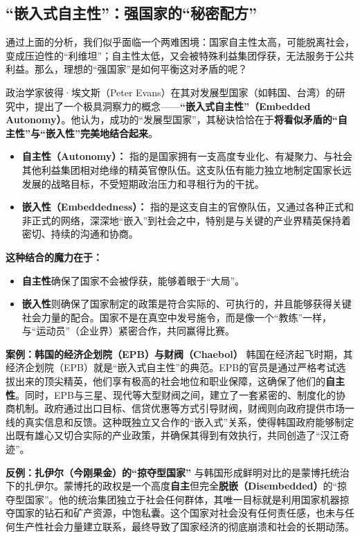 \hrulefill

\subsection{“嵌入式自主性”：强国家的“秘密配方”}

通过上面的分析，我们似乎面临一个两难困境：国家自主性太高，可能脱离社会，变成压迫性的“利维坦”；自主性太低，又会被特殊利益集团俘获，无法服务于公共利益。那么，理想的“强国家”是如何平衡这对矛盾的呢？

政治学家彼得·埃文斯（Peter Evans）在其对发展型国家（如韩国、台湾）的研究中，提出了一个极具洞察力的概念——\textbf{“嵌入式自主性”（Embedded Autonomy）}。他认为，成功的“发展型国家”，其秘诀恰恰在于\textbf{将看似矛盾的“自主性”与“嵌入性”完美地结合起来}。

\begin{itemize}
    \item \textbf{自主性（Autonomy）：} 指的是国家拥有一支高度专业化、有凝聚力、与社会其他利益集团相对绝缘的精英官僚队伍。这支队伍有能力独立地制定国家长远发展的战略目标，不受短期政治压力和寻租行为的干扰。
    \item \textbf{嵌入性（Embeddedness）：} 指的是这支自主的官僚队伍，又通过各种正式和非正式的网络，深深地“嵌入”到社会之中，特别是与关键的产业界精英保持着密切、持续的沟通和协商。
\end{itemize}

\textbf{这种结合的魔力在于：}
\begin{itemize}
    \item \textbf{自主性}确保了国家不会被俘获，能够着眼于“大局”。
    \item \textbf{嵌入性}则确保了国家制定的政策是符合实际的、可执行的，并且能够获得关键社会力量的配合。国家不是在真空中发号施令，而是像一个“教练”一样，与“运动员”（企业界）紧密合作，共同赢得比赛。
\end{itemize}

\textbf{案例：韩国的经济企划院（EPB）与财阀（Chaebol）}
韩国在经济起飞时期，其经济企划院（EPB）就是“嵌入式自主性”的典范。EPB的官员是通过严格考试选拔出来的顶尖精英，他们享有极高的社会地位和职业保障，这确保了他们的\textbf{自主性}。同时，EPB与三星、现代等大型财阀之间，建立了一套紧密的、制度化的协商机制。政府通过出口目标、信贷优惠等方式引导财阀，财阀则向政府提供市场一线的真实信息和反馈。这种既独立又合作的“嵌入式”关系，使得韩国政府能够制定出既有雄心又切合实际的产业政策，并确保其得到有效执行，共同创造了“汉江奇迹”。

\textbf{反例：扎伊尔（今刚果金）的“掠夺型国家”}
与韩国形成鲜明对比的是蒙博托统治下的扎伊尔。蒙博托的政权是一个高度\textbf{自主}但完全\textbf{脱嵌（Disembedded）}的“掠夺型国家”。他的统治集团独立于社会任何群体，其唯一目标就是利用国家机器掠夺国家的钻石和矿产资源，中饱私囊。这个国家对社会没有任何责任感，也未与任何生产性社会力量建立联系，最终导致了国家经济的彻底崩溃和社会的长期动荡。

